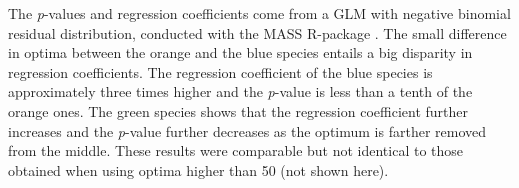 		The \textit{p}-values and regression coefficients come from a GLM with negative binomial residual distribution, conducted with the MASS R-package \citep{Venables2002}.
		The small difference in optima between the orange and the blue species entails a big disparity in regression coefficients. 
		The regression coefficient of the blue species is approximately three times higher and the \textit{p}-value is less than a tenth of the orange ones.
		The green species shows that the regression coefficient further increases and the \textit{p}-value further decreases as the optimum is farther removed from the middle. 
		These results were comparable but not identical to those obtained when using optima higher than 50 (not shown here).\\
		
		
